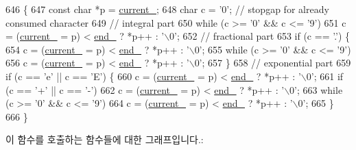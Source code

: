 \begin{DoxyCode}
646                         \{
647   \textcolor{keyword}{const} \textcolor{keywordtype}{char} *p = \hyperlink{class_json_1_1_reader_a2f2feb5201a26da7aa133d2f7434479b}{current\_};
648   \textcolor{keywordtype}{char} c = \textcolor{charliteral}{'0'}; \textcolor{comment}{// stopgap for already consumed character}
649   \textcolor{comment}{// integral part}
650   \textcolor{keywordflow}{while} (c >= \textcolor{charliteral}{'0'} && c <= \textcolor{charliteral}{'9'})
651     c = (\hyperlink{class_json_1_1_reader_a2f2feb5201a26da7aa133d2f7434479b}{current\_} = p) < \hyperlink{class_json_1_1_reader_a714793579cbf4ee7c5a7223d2c8d77c1}{end\_} ? *p++ : \textcolor{charliteral}{'\(\backslash\)0'};
652   \textcolor{comment}{// fractional part}
653   \textcolor{keywordflow}{if} (c == \textcolor{charliteral}{'.'}) \{
654     c = (\hyperlink{class_json_1_1_reader_a2f2feb5201a26da7aa133d2f7434479b}{current\_} = p) < \hyperlink{class_json_1_1_reader_a714793579cbf4ee7c5a7223d2c8d77c1}{end\_} ? *p++ : \textcolor{charliteral}{'\(\backslash\)0'};
655     \textcolor{keywordflow}{while} (c >= \textcolor{charliteral}{'0'} && c <= \textcolor{charliteral}{'9'})
656       c = (\hyperlink{class_json_1_1_reader_a2f2feb5201a26da7aa133d2f7434479b}{current\_} = p) < \hyperlink{class_json_1_1_reader_a714793579cbf4ee7c5a7223d2c8d77c1}{end\_} ? *p++ : \textcolor{charliteral}{'\(\backslash\)0'};
657   \}
658   \textcolor{comment}{// exponential part}
659   \textcolor{keywordflow}{if} (c == \textcolor{charliteral}{'e'} || c == \textcolor{charliteral}{'E'}) \{
660     c = (\hyperlink{class_json_1_1_reader_a2f2feb5201a26da7aa133d2f7434479b}{current\_} = p) < \hyperlink{class_json_1_1_reader_a714793579cbf4ee7c5a7223d2c8d77c1}{end\_} ? *p++ : \textcolor{charliteral}{'\(\backslash\)0'};
661     \textcolor{keywordflow}{if} (c == \textcolor{charliteral}{'+'} || c == \textcolor{charliteral}{'-'})
662       c = (\hyperlink{class_json_1_1_reader_a2f2feb5201a26da7aa133d2f7434479b}{current\_} = p) < \hyperlink{class_json_1_1_reader_a714793579cbf4ee7c5a7223d2c8d77c1}{end\_} ? *p++ : \textcolor{charliteral}{'\(\backslash\)0'};
663     \textcolor{keywordflow}{while} (c >= \textcolor{charliteral}{'0'} && c <= \textcolor{charliteral}{'9'})
664       c = (\hyperlink{class_json_1_1_reader_a2f2feb5201a26da7aa133d2f7434479b}{current\_} = p) < \hyperlink{class_json_1_1_reader_a714793579cbf4ee7c5a7223d2c8d77c1}{end\_} ? *p++ : \textcolor{charliteral}{'\(\backslash\)0'};
665   \}
666 \}
\end{DoxyCode}
이 함수를 호출하는 함수들에 대한 그래프입니다.\+:\nopagebreak
